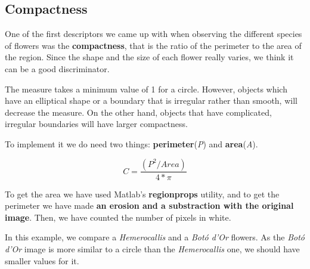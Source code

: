 \documentclass[11]{article}
\begin{document}
\subsection{Compactness}
One of the first descriptors we came up with when observing the different species of flowers was the \textbf{compactness}, that is the ratio of the perimeter to the area of the region. Since the shape and the size of each flower really varies, we think it can be a good discriminator. 

The measure takes a minimum value of 1 for a circle. However, objects which have an elliptical shape or a
boundary that is irregular rather than smooth, will
decrease the measure. On the other hand, objects that have complicated, irregular boundaries will have larger compactness.

\medskip

To implement it we do need two things: \textbf{perimeter}(\textit{P}) and \textbf{area}(\textit{A}).

$$C= \frac{(P^2 / Area)} {4*\pi}$$
  \medskip
  
 To get the area we have used Matlab's \textbf{regionprops} utility, and to get the perimeter we have made \textbf{an erosion and a substraction with the original image}. Then, we have counted the number of pixels in white. 
 \medskip 
 
 \noindent In this example, we compare a \textit{Hemerocallis} and a \textit{Botó d'Or} flowers. As the \textit{Botó d'Or} image is more similar to a circle than the \textit{Hemerocallis} one, we should have smaller values for it.
 
\end{document}
